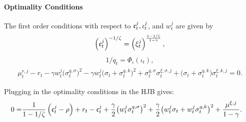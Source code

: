 \documentclass[12pt,english]{article}
\begin{document}
\paragraph{Optimality Conditions} The first order conditions with respect to $\frak{c}^j_t,\iota^j_t$, and $w^j_t$ are given by
\begin{align*}
\left(\frak{c}^j_t\right)^{-1/\zeta} = \left(\xi^j_t\right)^{\frac{1-1/\zeta}{1-\gamma}},
\end{align*}
\begin{align*}
1/q_t = \Phi_{\iota}(\iota_t),
\end{align*}
\begin{align*}
\mu^{r,j}_{t}-r_t - \gamma w^j_t \big(  \sigma^{q,\sigma}_t \big)^2  - \gamma w^j_t   \big( \sigma_t + \sigma^{q,k}_t \big)^2  +   \sigma^{q,\sigma}_t \sigma^{\xi,\sigma,j}_t  + \big( \sigma_t + \sigma^{q,k}_t\big) \sigma^{\xi,k,j}_t =0.
\end{align*}

Plugging in the optimality conditions in the HJB gives:
\begin{align}\label{eq:opt}
0 = & \frac{1}{1-1/\zeta} \left(\frak{c}^j_t-\rho\right) + r_t - \frak{c}^j_t + \frac{\gamma}{2} \big(  w^j_t  \sigma^{q,\sigma}_t \big)^2  + \frac{\gamma}{2}   \big( w^j_t  \sigma_t + w^j_t \sigma^{q,k}_t \big)^2 + \frac{\mu^{\xi,j}}{1-\gamma}. 
\end{align}
\end{document}
